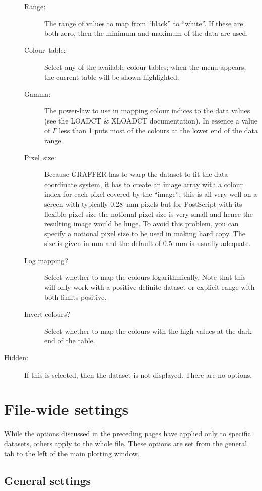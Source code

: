 \documentclass[11pt,twoside,english]{article}
\begin{document}
\begin{description}
  \begin{description}
  \item [Range:]The range of values to map from {}``black'' to
    {}``white''.  If these are both zero, then the minimum and maximum
    of the data are used.
  \item [Colour~table:]Select any of the available colour tables; when
    the menu appears, the current table will be shown highlighted.
  \item [Gamma:]The power-law to use in mapping colour indices to the
    data values (see the LOADCT \& XLOADCT documentation). In essence a
    value of $\Gamma$ less than 1 puts most of the colours at the lower
    end of the data range.
  \item [Pixel~size:]Because GRAFFER has to warp the dataset to fit the
    data coordinate system, it has to create an image array with a
    colour index for each pixel covered by the {}``image''; this is all
    very well on a screen with typically 0.28~mm pixels but for
    PostScript with its flexible pixel size the notional pixel size is
    very small and hence the resulting image would be huge. To avoid
    this problem, you can specify a notional pixel size to be used in
    making hard copy.  The size is given in mm and the default of
    0.5~mm is usually adequate.
  \item[Log mapping?] Select whether to map the colours
    logarithmically. Note that this will only work with a
    positive-definite dataset or explicit range with both limits
    positive.
  \item[Invert colours?] Select whether to map the colours with the
    high values at the dark end of the table.
  \end{description}
\item[Hidden:] If this is selected, then the dataset is not
  displayed. There are no options.
\end{description}

\section{File-wide settings}

While the options discussed in the preceding pages have applied only to
specific datasets, others apply to the whole file. These options are
set from the \textsf{general} tab to the left of the main plotting
window.


\subsection{General settings}
\end{document}
